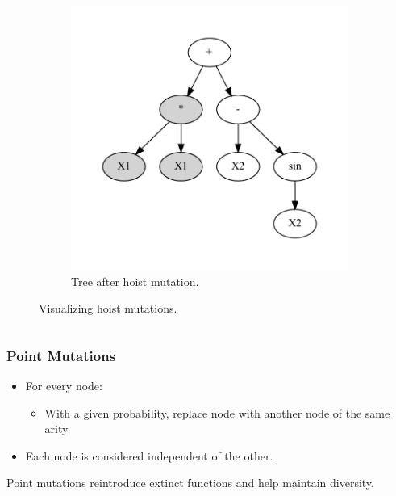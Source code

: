 \documentclass{beamer}
\begin{document}
\begin{frame}
\begin{columns}
\begin{column}{0.6\textwidth}
\begin{figure}
\begin{subfigure}{0.6\textwidth}
          \includegraphics[scale=0.23]{images/graphviz/hoist_mut_after.dot.pdf}
          \caption{Tree after hoist mutation.}
          \label{fig:hoist_mutb}
        \end{subfigure}
        \caption{Visualizing hoist mutations.}
        \label{fig:hoist}
      \end{figure}
    \end{column}
  \end{columns}
\end{frame}

\begin{frame}
  \frametitle{Point Mutations}
  \begin{itemize}
    \item For every node: 
    \begin{itemize}
      \item With a given probability, replace node with another node of the same arity
    \end{itemize}
    \item Each node is considered independent of the other.
  \end{itemize}
  Point mutations reintroduce extinct functions and help maintain diversity.
\end{frame}
\end{document}
